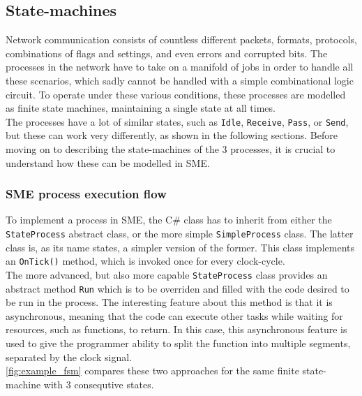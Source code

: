 \subsection{State-machines}
Network communication consists of countless different packets, formats,
protocols, combinations of flags and settings, and even errors and corrupted
bits. The processes in the network have to take on a manifold of jobs in order
to handle all these scenarios, which sadly cannot be handled with a simple
combinational logic circuit. To operate under these various conditions, these
processes are modelled as finite state machines, maintaining a single state at
all times.\\
The processes have a lot of similar states, such as \texttt{Idle}, \texttt{Receive},
\texttt{Pass}, or \texttt{Send}, but these can work very differently, as shown
in the following sections. Before moving on to describing the state-machines of
the 3 processes, it is crucial to understand how these can be modelled in SME.

\subsubsection{SME process execution flow}
To implement a process in SME, the C\# class has to inherit from
either the \texttt{StateProcess} abstract class, or the more simple
\texttt{SimpleProcess} class.
The latter class is, as its name states, a simpler version of the former. This
class implements an \texttt{OnTick()} method, which is invoked once for every
clock-cycle.\\
The more advanced, but also more capable \texttt{StateProcess}
class provides an abstract method \texttt{Run} which is to be overriden and filled
with the code desired to be run in the process. The interesting feature
about this method is that it is asynchronous, meaning that the code can
execute other tasks while waiting for resources, such as functions,
to return. In this case, this asynchronous feature is used to give
the programmer ability to split the function into multiple segments,
separated by the clock signal.\\
\autoref{fig:example_fsm} compares these two approaches for the same
finite state-machine with 3 consequtive states.

